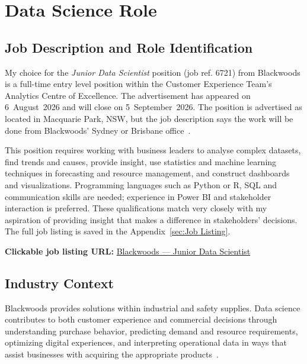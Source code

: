 \section{Data Science Role}
\label{sec:Data Science Role}

\subsection{Job Description and Role Identification}
\label{subsec:Job Description and Role Identification}

My choice for the \emph{Junior Data Scientist} position (job ref. 6721) from Blackwoods is a full-time entry level position within the Customer Experience Team’s Analytics Centre of Excellence. The advertisement has appeared on 6~August~2026 and will close on 5~September~2026. The position is advertised as located in Macquarie Park, NSW, but the job description says the work will be done from Blackwoods’ Sydney or Brisbane office~\cite{blackwoods2026job}.

This position requires working with business leaders to analyse complex datasets, find trends and causes, provide insight, use statistics and machine learning techniques in forecasting and resource management, and construct dashboards and visualizations. Programming languages such as Python or R, SQL and communication skills are needed; experience in Power BI and stakeholder interaction is preferred. These qualifications match very closely with my aspiration of providing insight that makes a difference in stakeholders' decisions. The full job listing is saved in the Appendix~\ref{sec:Job Listing}.

\noindent\textbf{Clickable job listing URL:}
\href{https://www.livehire.com/careers/blackwoods/job/DB9HM/1W7S2DP3U/junior-data-scientist}{Blackwoods --- Junior Data Scientist}


\subsection{Industry Context}
\label{subsec:Industry Context}

Blackwoods provides solutions within industrial and safety supplies. Data science contributes to both customer experience and commercial decisions through understanding purchase behavior, predicting demand and resource requirements, optimizing digital experiences, and interpreting operational data in ways that assist businesses with acquiring the appropriate products~\cite{blackwoods2026job}.

